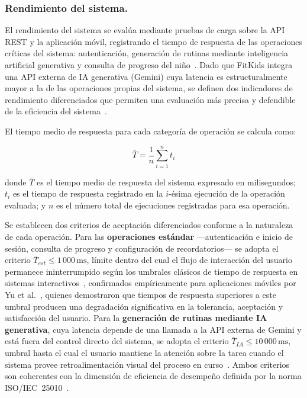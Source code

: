 				\subsubsection{Rendimiento del sistema.}
					El rendimiento del sistema se evalúa mediante pruebas de carga sobre la API REST y la aplicación móvil, registrando el tiempo de respuesta de las operaciones críticas del sistema: autenticación, generación de rutinas mediante inteligencia artificial generativa y consulta de progreso del niño~\cite{GuerreroUlloa2024,Fowler2002}. Dado que FitKids integra una API externa de IA generativa (Gemini) cuya latencia es estructuralmente mayor a la de las operaciones propias del sistema, se definen dos indicadores de rendimiento diferenciados que permiten una evaluación más precisa y defendible de la eficiencia del sistema~\cite{Yu2020}.
					
					El tiempo medio de respuesta para cada categoría de operación se calcula como:
					
					\begin{equation}
						\label{ec:tr}
						\bar{T} = \frac{1}{n} \sum_{i=1}^{n} t_i
					\end{equation}
					
					donde $\bar{T}$ es el tiempo medio de respuesta del sistema expresado en milisegundos; $t_i$ es el tiempo de respuesta registrado en la $i$-ésima ejecución de la operación evaluada; y $n$ es el número total de ejecuciones registradas para esa operación.
					
					Se establecen dos criterios de aceptación diferenciados conforme a la naturaleza de cada operación. Para las \textbf{operaciones estándar} ---autenticación e inicio de sesión, consulta de progreso y configuración de recordatorios--- se adopta el criterio $\bar{T}_{est} \leq 1\,000\,\text{ms}$, límite dentro del cual el flujo de interacción del usuario permanece ininterrumpido según los umbrales clásicos de tiempo de respuesta en sistemas interactivos~\cite{Nielsen1994}, confirmados empíricamente para aplicaciones móviles por Yu et al.~\cite{Yu2020}, quienes demostraron que tiempos de respuesta superiores a este umbral producen una degradación significativa en la tolerancia, aceptación y satisfacción del usuario. Para la \textbf{generación de rutinas mediante IA generativa}, cuya latencia depende de una llamada a la API externa de Gemini y está fuera del control directo del sistema, se adopta el criterio $\bar{T}_{IA} \leq 10\,000\,\text{ms}$, umbral hasta el cual el usuario mantiene la atención sobre la tarea cuando el sistema provee retroalimentación visual del proceso en curso~\cite{Nielsen1994}. Ambos criterios son coherentes con la dimensión de eficiencia de desempeño definida por la norma ISO/IEC~25010~\cite{GuerreroUlloa2024}.
			

